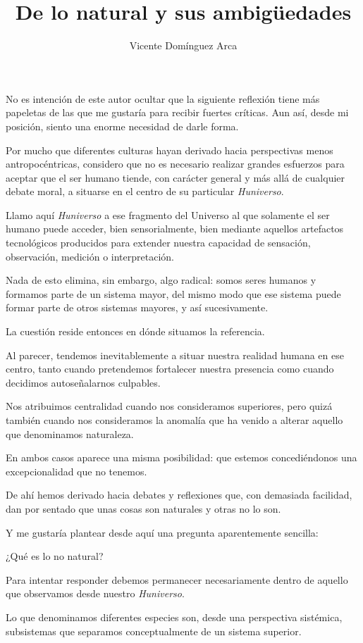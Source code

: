 \documentclass[12pt,a4paper]{article}
\title{De lo natural y sus ambigüedades}
\author{Vicente Domínguez Arca}
\date{}
\begin{document}
\maketitle

No es intención de este autor ocultar que la siguiente reflexión tiene más papeletas de las que me gustaría para recibir fuertes críticas. Aun así, desde mi posición, siento una enorme necesidad de darle forma.

Por mucho que diferentes culturas hayan derivado hacia perspectivas menos antropocéntricas, considero que no es necesario realizar grandes esfuerzos para aceptar que el ser humano tiende, con carácter general y más allá de cualquier debate moral, a situarse en el centro de su particular \emph{Huniverso}.

Llamo aquí \emph{Huniverso} a ese fragmento del Universo al que solamente el ser humano puede acceder, bien sensorialmente, bien mediante aquellos artefactos tecnológicos producidos para extender nuestra capacidad de sensación, observación, medición o interpretación.

Nada de esto elimina, sin embargo, algo radical: somos seres humanos y formamos parte de un sistema mayor, del mismo modo que ese sistema puede formar parte de otros sistemas mayores, y así sucesivamente.

La cuestión reside entonces en dónde situamos la referencia.

Al parecer, tendemos inevitablemente a situar nuestra realidad humana en ese centro, tanto cuando pretendemos fortalecer nuestra presencia como cuando decidimos autoseñalarnos culpables.

Nos atribuimos centralidad cuando nos consideramos superiores, pero quizá también cuando nos consideramos la anomalía que ha venido a alterar aquello que denominamos naturaleza.

En ambos casos aparece una misma posibilidad: que estemos concediéndonos una excepcionalidad que no tenemos.

De ahí hemos derivado hacia debates y reflexiones que, con demasiada facilidad, dan por sentado que unas cosas son naturales y otras no lo son.

Y me gustaría plantear desde aquí una pregunta aparentemente sencilla:

¿Qué es lo no natural?

Para intentar responder debemos permanecer necesariamente dentro de aquello que observamos desde nuestro \emph{Huniverso}.

Lo que denominamos diferentes especies son, desde una perspectiva sistémica, subsistemas que separamos conceptualmente de un sistema superior.
\end{document}

